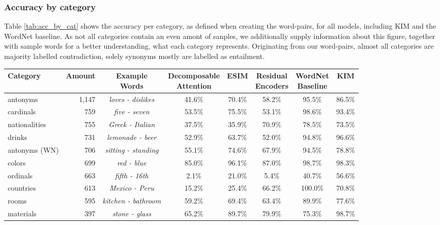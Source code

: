 \subsubsection{Accuracy by category}
Table \ref{tab:acc_by_cat} shows the accuracy per category, as defined when creating the word-pairs, for all models, including \ac{KIM} and the WordNet baseline. As not all categories contain an even amont of sanples, we additionally supply information about this figure, together with sample words for a better understanding, what each category represents. Originating from our word-pairs, almost all categories are majority labelled contradiction, solely synonyms mostly are labelled as entailment.
\begin{table}[tph!]
\centering
\begin{tabular}{lrc|ccccc} 
\toprule
\textbf{Category} & \textbf{Amount} & \specialcellc{\textbf{Example}\\\textbf{Words}} & \specialcellc{\textbf{Decomposable}\\\textbf{Attention}} & \textbf{ESIM} & \specialcellc{\textbf{Residual}\\\textbf{Encoders}} & \specialcellc{\textbf{WordNet}\\\textbf{Baseline}} & \textbf{KIM}  \\ \midrule
antonyms & 1,147 & \textit{loves - dislikes} & 41.6\% & 70.4\%& 58.2\% &  95.5\% & 86.5\% \\ 
cardinals & 759 &\textit{five - seven} & 53.5\% &75.5\% & 53.1\% & 98.6\% & 93.4\% \\ 
nationalities & 755 & \textit{Greek - Italian} & 37.5\% &35.9\% & 70.9\% & 78.5\% & 73.5\% \\ 
drinks & 731 & \textit{lemonade - beer} & 52.9\% &63.7\% & 52.0\% & 94.8\% & 96.6\% \\ 
antonyms (WN) & 706 & \textit{sitting - standing} & 55.1\% & 74.6\%& 67.9\% & 94.5\% & 78.8\% \\
colors & 699 & \textit{red - blue} & 85.0\% &96.1\% & 87.0\% & 98.7\% & 98.3\% \\ 
ordinals & 663 & \textit{fifth - 16th} & 2.1\% &21.0\% & 5.4\% &40.7\% & 56.6\% \\ 
countries & 613 & \textit{Mexico - Peru} & 15.2\% &25.4\% & 66.2\% & 100.0\% & 70.8\% \\ 
rooms & 595 & \textit{kitchen - bathroom} & 59.2\% &69.4\% & 63.4\% & 89.9\% & 77.6\% \\ 
materials & 397 & \textit{stone - glass} & 65.2\% & 89.7\%& 79.9\% & 75.3\% & 98.7\% \\

\end{tabular}
\end{table}
